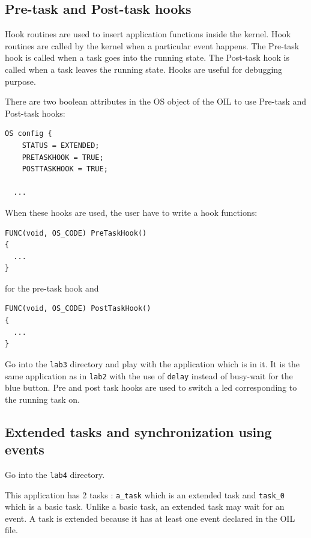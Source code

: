 \documentclass[11pt]{article}
\begin{document}
\subsection{Pre-task and Post-task hooks}

Hook routines are used to insert application functions inside the kernel. Hook routines are called by the kernel when a particular event happens. The Pre-task hook is called when a task goes into the running state. The Post-task hook is called when a task leaves the running state. Hooks are useful for debugging purpose.

There are two boolean attributes in the OS object of the OIL to use Pre-task and Post-task hooks:

\begin{lstlisting}[language=OIL]
  OS config {
    STATUS = EXTENDED;
    PRETASKHOOK = TRUE;
    POSTTASKHOOK = TRUE;
    
  ...
\end{lstlisting}

When these hooks are used, the user have to write a hook functions:

\begin{lstlisting}
FUNC(void, OS_CODE) PreTaskHook()
{
  ...
}
\end{lstlisting}

for the pre-task hook and

\begin{lstlisting}
FUNC(void, OS_CODE) PostTaskHook()
{
  ...
}
\end{lstlisting}


Go into the \texttt{lab3} directory and play with the application which is in it. It is the same application as in \lstinline{lab2} with the use of \lstinline{delay} instead of busy-wait for the blue button. Pre and post task hooks are used to switch a led corresponding to the running task on.

\subsection{Extended tasks and synchronization using events}

Go into the \lstinline{lab4} directory.

This application has 2 tasks : \lstinline{a_task} which is an extended task and \lstinline{task_0} which is a basic task. Unlike a basic task, an extended task may wait for an event. A task is extended because it has at least one event declared in the OIL file.
\end{document}
